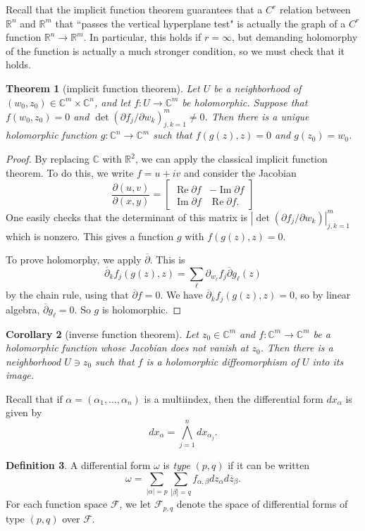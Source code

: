 \documentclass[12pt]{report}
\newcommand{\RR}{\mathbb{R}}
\newcommand{\CC}{\mathbb{C}}
\newcommand{\dbar}{\overline \partial}
\renewcommand{\Re}{\operatorname{Re}}
\renewcommand{\Im}{\operatorname{Im}}
\newcommand{\dfn}[1]{\emph{#1}\index{#1}}
\newtheorem{theorem}{Theorem}[chapter]
\newtheorem{corollary}[theorem]{Corollary}
\theoremstyle{definition}
\newtheorem{definition}[theorem]{Definition}
\begin{document}
Recall that the implicit function theorem guarantees that a $C^r$ relation between $\RR^n$ and $\RR^m$ that ``passes the vertical hyperplane test" is actually the graph of a $C^r$ function $\RR^n \to \RR^m$. In particular, this holds if $r = \infty$, but demanding holomorphy of the function is actually a much stronger condition, so we must check that it holds.
\begin{theorem}[implicit function theorem]
    Let $U$ be a neighborhood of $(w_0, z_0) \in \CC^m \times \CC^n$, and let $f: U \to \CC^m$ be holomorphic. Suppose that $f(w_0, z_0) = 0$ and $\det(\partial f_j/\partial w_k)_{j,k=1}^m \neq 0$. Then there is a unique holomorphic function $g: \CC^n \to \CC^m$ such that $f(g(z), z) = 0$ and $g(z_0) = w_0$.
\end{theorem}
\begin{proof}
    By replacing $\CC$ with $\RR^2$, we can apply the classical implicit function theorem. To do this, we write $f = u + iv$ and consider the Jacobian
$$\frac{\partial(u,v)}{\partial(x,y)} = \begin{bmatrix}
    \Re \partial f & -\Im \partial f\\
    \Im \partial f & \Re \partial f.
\end{bmatrix}$$
    One easily checks that the determinant of this matrix is $|\det(\partial f_j/\partial w_k)|_{j,k=1}^m$ which is nonzero. This gives a function $g$ with $f(g(z), z) = 0$.
    
    To prove holomorphy, we apply $\dbar$. This is
$$\dbar_k f_j(g(z), z) = \sum_\ell \partial_{w_\ell} f_j \dbar g_\ell(z)$$
    by the chain rule, using that $\dbar f = 0$. We have $\dbar_k f_j(g(z), z) = 0$, so by linear algebra, $\dbar g_\ell = 0$. So $g$ is holomorphic.
\end{proof}
\begin{corollary}[inverse function theorem]
    Let $z_0 \in \CC^m$ and $f: \CC^m \to \CC^m$ be a  holomorphic function whose Jacobian does not vanish at $z_0$. Then there is a neighborhood $U \ni z_0$ such that $f$ is a holomorphic diffeomorphism of $U$ into its image.
\end{corollary}

    Recall that if $\alpha = (\alpha_1, \dots, \alpha_n)$ is a multiindex, then the differential form $dx_\alpha$ is given by
    $$dx_\alpha = \bigwedge_{j=1}^n dx_{\alpha_j}.$$
\begin{definition}
    A differential form $\omega$ is \dfn{type} $(p, q)$ if it can be written
    $$\omega = \sum_{|\alpha| = p} \sum_{|\beta| = q} f_{\alpha,\beta} dz_\alpha d\overline z_\beta.$$
    For each function space $\mathcal F$, we let $\mathcal F_{p,q}$ denote the space of differential forms of type $(p, q)$ over $\mathcal F$.
\end{definition}
\end{document}
